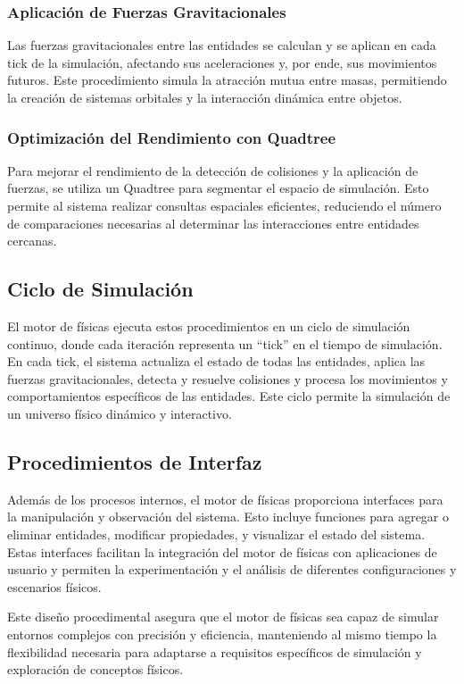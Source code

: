 \subsubsection{Aplicación de Fuerzas Gravitacionales}
Las fuerzas gravitacionales entre las entidades se calculan y se aplican en cada tick de la simulación, afectando sus aceleraciones y, por ende, sus movimientos futuros. Este procedimiento simula la atracción mutua entre masas, permitiendo la creación de sistemas orbitales y la interacción dinámica entre objetos.

\subsubsection{Optimización del Rendimiento con Quadtree}
Para mejorar el rendimiento de la detección de colisiones y la aplicación de fuerzas, se utiliza un Quadtree para segmentar el espacio de simulación. Esto permite al sistema realizar consultas espaciales eficientes, reduciendo el número de comparaciones necesarias al determinar las interacciones entre entidades cercanas.

\subsection{Ciclo de Simulación}
El motor de físicas ejecuta estos procedimientos en un ciclo de simulación continuo, donde cada iteración representa un ``tick'' en el tiempo de simulación. En cada tick, el sistema actualiza el estado de todas las entidades, aplica las fuerzas gravitacionales, detecta y resuelve colisiones y procesa los movimientos y comportamientos específicos de las entidades. Este ciclo permite la simulación de un universo físico dinámico y interactivo.

\subsection{Procedimientos de Interfaz}
Además de los procesos internos, el motor de físicas proporciona interfaces para la manipulación y observación del sistema. Esto incluye funciones para agregar o eliminar entidades, modificar propiedades, y visualizar el estado del sistema. Estas interfaces facilitan la integración del motor de físicas con aplicaciones de usuario y permiten la experimentación y el análisis de diferentes configuraciones y escenarios físicos.

Este diseño procedimental asegura que el motor de físicas sea capaz de simular entornos complejos con precisión y eficiencia, manteniendo al mismo tiempo la flexibilidad necesaria para adaptarse a requisitos específicos de simulación y exploración de conceptos físicos.

